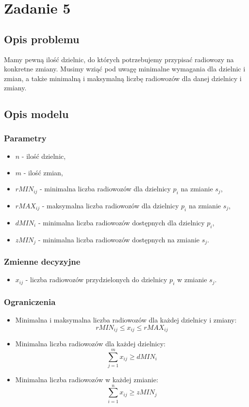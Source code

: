 \documentclass{article}
\begin{document}
\section{Zadanie 5}
\subsection{Opis problemu}
Mamy pewną ilość dzielnic, do których potrzebujemy przypisać radiowozy na konkretne zmiany.
Musimy wziąć pod uwagę minimalne wymagania dla dzielnic i zmian, a także minimalną i maksymalną liczbę radiowozów dla danej dzielnicy i zmiany.

\subsection{Opis modelu}

\subsubsection{Parametry}
\begin{itemize}
    \item $n$ - ilość dzielnic,
    \item $m$ - ilość zmian,
    \item $rMIN_{ij}$ - minimalna liczba radiowozów dla dzielnicy $p_i$ na zmianie $s_j$,
    \item $rMAX_{ij}$ - maksymalna liczba radiowozów dla dzielnicy $p_i$ na zmianie $s_j$,
    \item $dMIN_i$ - minimalna liczba radiowozów dostępnych dla dzielnicy $p_i$,
    \item $zMIN_j$ - minimalna liczba radiowozów dostępnych na zmianie $s_j$.
\end{itemize}

\subsubsection{Zmienne decyzyjne}
\begin{itemize}
    \item $x_{ij}$ - liczba radiowozów przydzielonych do dzielnicy $p_i$ w zmianie $s_j$.
\end{itemize}

\subsubsection{Ograniczenia}
\begin{itemize}
    \item Minimalna i maksymalna liczba radiowozów dla każdej dzielnicy i zmiany:
    \[
    rMIN_{ij} \leq x_{ij} \leq rMAX_{ij}
    \]
    \item Minimalna liczba radiowozów dla każdej dzielnicy:
    \[
    \sum_{j=1}^{m} x_{ij} \geq dMIN_i
    \]
    \item Minimalna liczba radiowozów w każdej zmianie:
    \[
    \sum_{i=1}^{n} x_{ij} \geq zMIN_j
    \]
\end{itemize}
\end{document}
